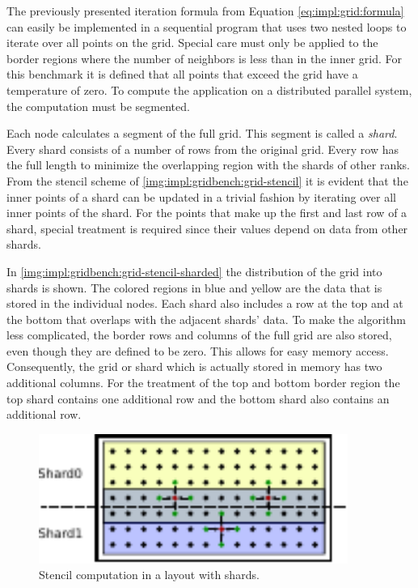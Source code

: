 The previously presented iteration formula from Equation \eqref{eq:impl:grid:formula} can easily be implemented in a sequential program that uses two nested loops to iterate over all points on the grid. Special care must only be applied to the border regions where the number of neighbors is less than in the inner grid. For this benchmark it is defined that all points that exceed the grid have a temperature of zero. To compute the application on a distributed parallel system, the computation must be segmented. 

Each node calculates a segment of the full grid. This segment is called a \emph{shard}. Every shard consists of a number of rows from the original grid. Every row has the full length to minimize the overlapping region with the shards of other ranks. From the stencil scheme of \autoref{img:impl:gridbench:grid-stencil} it is evident that the inner points of a shard can be updated in a trivial fashion by iterating over all inner points of the shard. For the points that make up the first and last row of a shard, special treatment is required since their values depend on data from other shards.

In \autoref{img:impl:gridbench:grid-stencil-sharded} the distribution of the grid into shards is shown. The colored regions in blue and yellow are the data that is stored in the individual nodes. Each shard also includes a row at the top and at the bottom that overlaps with the adjacent shards' data. To make the algorithm less complicated, the border rows and columns of the full grid are also stored, even though they are defined to be zero. This allows for easy memory access. Consequently, the grid or shard which is actually stored in memory has two additional columns. For the treatment of the top and bottom border region the top shard contains one additional row and the bottom shard also contains an additional row. 

\begin{figure}[htb]
\centering
\includegraphics[width=0.9\textwidth]{img/bench-grid-stencil-sharded}
\caption{Stencil computation in a layout with shards.}
\label{img:impl:gridbench:grid-stencil-sharded}
\end{figure}

